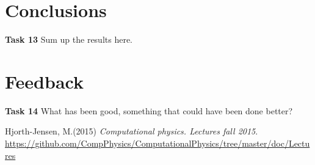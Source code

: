 \documentclass{article}
\begin{document}
\section{Conclusions}
\textbf{Task 13} Sum up the results here.

\section{Feedback}
\textbf{Task 14} What has been good, something that could have been done better?

\begin{thebibliography}{9}
	Hjorth-Jensen, M.(2015)
	\textit{Computational physics. Lectures fall 2015}. 
	\url{https://github.com/CompPhysics/ComputationalPhysics/tree/master/doc/Lectures}
\end{thebibliography}
\end{document}

